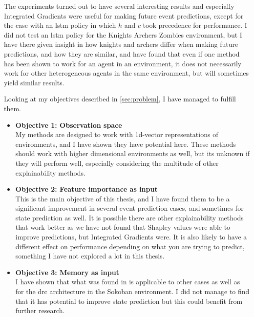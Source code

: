 \documentclass[UKenglish]{uiomasterthesis}
\begin{document}
The experiments turned out to have several interesting results and especially Integrated Gradients were useful for making future event predictions, except for the case with an \ac{lstm} policy in which $h$ and $c$ took precedence for performance. I did not test an \ac{lstm} policy for the Knights Archers Zombies environment, but I have there given insight in how knights and archers differ when making future predictions, and how they are similar, and have found that even if one method has been shown to work for an agent in an environment, it does not necessarily work for other heterogeneous agents in the same environment, but will sometimes yield similar results.

Looking at my objectives described in \cref{sec:problem}, I have managed to fulfill them.

\begin{itemize}
    \item \textbf{Objective 1: Observation space}\\
        My methods are designed to work with 1d-vector representations of environments, and I have shown they have potential here. These methods should work with higher dimensional environments as well, but its unknown if they will perform well, especially considering the multitude of other explainability methods.
        

    \item \textbf{Objective 2: Feature importance as input}\\
        This is the main objective of this thesis, and I have found them to be a significant improvement in several event prediction cases, and sometimes for state prediction as well. It is possible there are other explainability methods that work better as we have not found that Shapley values were able to improve predictions, but Integrated Gradients were. It is also likely to have a different effect on performance depending on what you are trying to predict, something I have not explored a lot in this thesis.
        

    \item \textbf{Objective 3: Memory as input}\\
        I have shown that what was found in \cite{chung2024predictingfutureactionsreinforcement} is applicable to other cases as well as for the \ac{drc} architecture in the Sokoban\cite{sokoban} environment. I did not manage to find that it has potential to improve state prediction but this could benefit from further research.
\end{itemize}


\printbibliography{}
\end{document}
